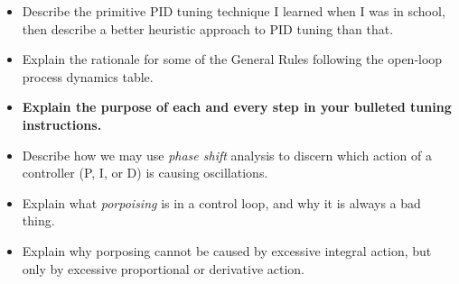 \begin{itemize}
\item{} Describe the primitive PID tuning technique I learned when I was in school, then describe a better heuristic approach to PID tuning than that.
\item{} Explain the rationale for some of the General Rules following the open-loop process dynamics table.
\item{} {\bf Explain the purpose of each and every step in your bulleted tuning instructions.}
\item{} Describe how we may use {\it phase shift} analysis to discern which action of a controller (P, I, or D) is causing oscillations.
\item{} Explain what {\it porpoising} is in a control loop, and why it is always a bad thing.
\item{} Explain why porposing cannot be caused by excessive integral action, but only by excessive proportional or derivative action.
\end{itemize}




